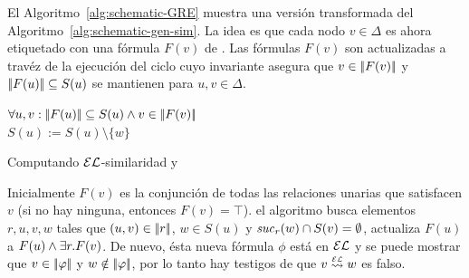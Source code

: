 El Algoritmo~\ref{alg:schematic-GRE} muestra una versi\'on transformada del 
Algoritmo~\ref{alg:schematic-gen-sim}. La idea es que cada nodo
$v\in\Delta$ es ahora etiquetado con una f\'ormula
$F(v)$ de \EL. Las f\'ormulas $F(v)$ son actualizadas a trav\'ez de la ejecuci\'on del ciclo cuyo invariante asegura que $v \in
|\!|F(v)|\!|$ y $|\!|F(u)|\!| \subseteq S(u)$ se mantienen para
$u,v\in\Delta$.

%
%
%
%


\begin{algorithm}\small
{}
\io


\While{\guard}
{
  $\forall u,v: |\!|F(u)|\!| \subseteq S(u)\wedge v \in |\!|F(v)|\!|$\\
$S(u):=S(u)\setminus\{w\}$ \label{alg:line:loop-body-begin}

} \caption{\small
Computando $\mathcal{EL}$-similaridad y \posre}\label{alg:schematic-GRE}
\end{algorithm}

Inicialmente $F(v)$ es la conjunci\'on de todas las relaciones unarias que
satisfacen $v$ (si no hay ninguna, entonces $F(v)=\top$).
el algoritmo busca elementos $r,u,v,w$ tales que
$(u,v)\in|\!|r|\!|$, $w\in S(u)$ y ${\it suc}_{r}(w)\cap
S(v)=\emptyset$, actualiza $F(u)$ a $F(u)\wedge\exists r. F(v)$.
De nuevo, \'esta nueva f\'ormula $\phi$ est\'a en $\mathcal{EL}$ y se puede mostrar que
$v\in|\!|\varphi|\!|$ y $w\notin|\!|\varphi|\!|$, por lo tanto hay testigos de que $v\simil{\EL} w$ es falso.

